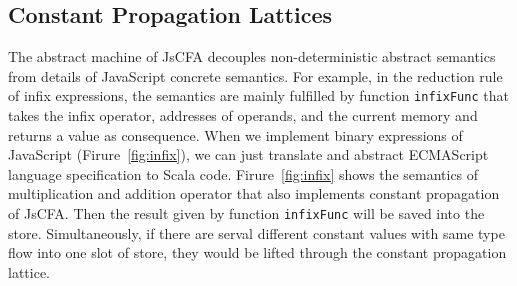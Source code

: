 \documentclass{article}
\begin{document}
\iffalse
\subsection{Constant Propagation Lattices}
\label{sub:Constant Propagation Lattices}

The abstract machine of JsCFA decouples non-deterministic abstract semantics from details of JavaScript concrete semantics. For example, in the reduction rule of infix expressions, the semantics are mainly fulfilled by function \verb|infixFunc| that takes the infix operator, addresses of operands, and the current memory and returns a value as consequence. When we implement binary expressions of JavaScript (Firure~\ref{fig:infix}), we can just translate and abstract ECMAScript language specification to Scala code. Firure~\ref{fig:infix} shows the semantics of multiplication and addition operator that also implements constant propagation of JsCFA\@. Then the result given by function \verb|infixFunc| will be saved into the store. Simultaneously, if there are serval different constant values with same type flow into one slot of store, they would be lifted through the constant propagation lattice.



\end{document}

